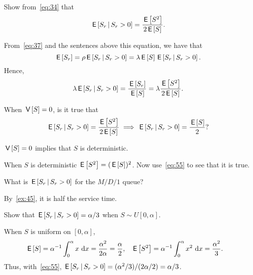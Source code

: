\begin{exercise} 
Show from~\cref{eq:34} that 
\begin{equation}\label{eq:55}
\,\mathsf{E}\left[S_r\,\middle|\, S_r>0\right] = \frac{\,\mathsf{E}\left[S^2\right]}{2 \,\mathsf{E}\left[S\right]}.
\end{equation}
\begin{solution}
 From~\cref{eq:37} and the sentences above this equation,
 we have that
 \begin{equation*}
 \,\mathsf{E}\left[S_r\right] = \rho \,\mathsf{E}\left[S_r\,\middle|\, S_r>0\right]=\lambda \,\mathsf{E}\left[S\right] \,\mathsf{E}\left[S_r\,\middle|\, S_r>0\right].
 \end{equation*}
Hence,
 \begin{equation*}
 \lambda \,\mathsf{E}\left[S_r\,\middle|\, S_r>0\right] = \frac{\,\mathsf{E}\left[S_r\right]}{\,\mathsf{E}\left[S\right]} = \lambda \frac{\,\mathsf{E}\left[S^2\right]}{2 \,\mathsf{E}\left[S\right]}.
 \end{equation*}
\end{solution}
\end{exercise}


\begin{extra}
When $\,\mathsf{V}\left[S\right] = 0$, is it true that
\begin{equation*}
\,\mathsf{E}\left[S_r\,\middle|\, S_r>0\right] = \frac{\,\mathsf{E}\left[S^2\right]}{2 \,\mathsf{E}\left[S\right]} \implies \,\mathsf{E}\left[S_r\,\middle|\, S_r>0\right] = \frac{\,\mathsf{E}\left[S\right]} 2?
\end{equation*}
\begin{hint}
 $\,\mathsf{V}\left[S\right] = 0$ implies that $S$ is deterministic.
\end{hint}
\begin{solution}
 When $S$ is deterministic $\,\mathsf{E}\left[S^2\right] = (\,\mathsf{E}\left[S\right])^2$. Now use~\cref{eq:55} to see that it is true.
\end{solution}
\end{extra}

\begin{extra}
 What is $\,\mathsf{E}\left[S_r\,\middle|\, S_r>0\right]$ for the $M/D/1$ queue? 
\begin{solution}
By~\cref{ex:45}, it is half the service time. 
\end{solution}
\end{extra}

\begin{extra}
Show that $\,\mathsf{E}\left[S_r\,\middle|\, S_r>0\right] = \alpha/3$ when $S \sim U[0, \alpha]$.
\begin{solution}
 When $S$ is uniform on $[0, \alpha]$,
 \begin{align*}
 \,\mathsf{E}\left[S\right] &= \alpha^{-1}\int_0^\alpha x \, \,\text{d}x =\frac{\alpha^2}{2 \alpha} = \frac{\alpha}2, 
&
\,\mathsf{E}\left[S^2\right] &= \alpha^{-1}\int_0^\alpha x^2 \, \,\text{d}x = \frac{\alpha^2}3. 
 \end{align*}
 Thus, with~\cref{eq:55}, $\,\mathsf{E}\left[S_r\,\middle|\, S_r>0\right] = (\alpha^2/3)/(2 \alpha/2) = \alpha/3$. 
\end{solution}
\end{extra}

